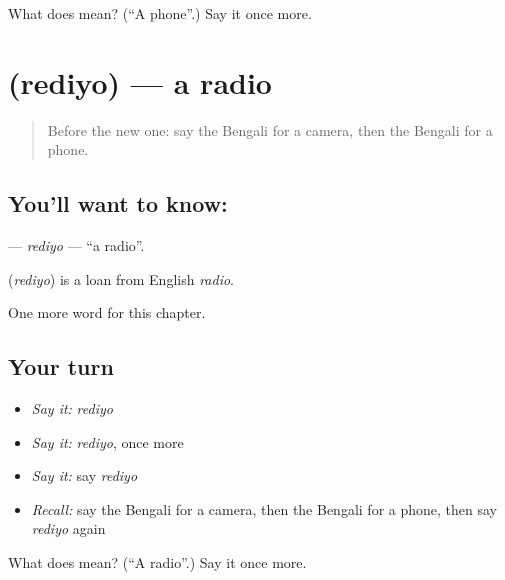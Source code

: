 \begin{tcolorbox}[breakable,colback=teal!4,colframe=teal!35!black,title={Before you move on}]
What does  mean? (\textquotedblleft{}A phone\textquotedblright{}.) Say it once more.
\end{tcolorbox}
\section[\texorpdfstring{\bn{রেডিও} (rediyo)}{রেডিও (rediyo)}]{ (rediyo) — a radio}

\label{lesson:BN-C132-rediyo}



\begin{quote}
Before the new one: say the Bengali for a camera, then the Bengali for a phone.
\end{quote}

\subsection*{You'll want to know: }
\textbf{} — \emph{rediyo} — \textquotedblleft{}a radio\textquotedblright{}.

\begin{cousinweb}
\textbf{} (\emph{rediyo}) is a loan from English \emph{radio}.
\end{cousinweb}

\begin{grammarlens}[title={What you've built}]
One more word for this chapter.
\end{grammarlens}

\subsection*{Your turn}
\begin{itemize}
\raggedright
  \item \emph{Say it:} \emph{rediyo}
  \item \emph{Say it:} \emph{rediyo}, once more
  \item \emph{Say it:} say \emph{rediyo}
  \item \emph{Recall:} say the Bengali for a camera, then the Bengali for a phone, then say \emph{rediyo} again
\end{itemize}

\begin{tcolorbox}[breakable,colback=teal!4,colframe=teal!35!black,title={Before you move on}]
What does  mean? (\textquotedblleft{}A radio\textquotedblright{}.) Say it once more.
\end{tcolorbox}
